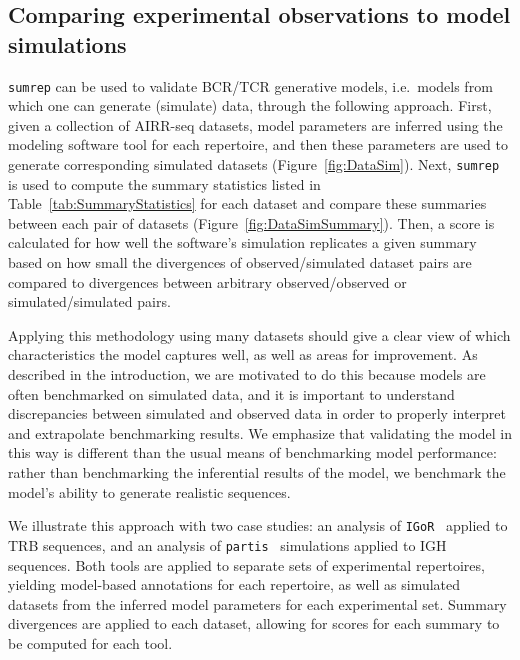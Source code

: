 \documentclass{article}
\newcommand{\partis}{\texttt{partis}}
\newcommand{\igor}{\texttt{IGoR}}
\begin{document}
\subsection*{Comparing experimental observations to model simulations}
\texttt{sumrep} can be used to validate BCR/TCR generative models, i.e.\ models from which one can generate (simulate) data, through the following approach.
First, given a collection of AIRR-seq datasets, model parameters are inferred using the modeling software tool for each repertoire, and then these parameters are used to generate corresponding simulated datasets (Figure~\ref{fig:DataSim}).
Next, \texttt{sumrep} is used to compute the summary statistics listed in Table~\ref{tab:SummaryStatistics} for each dataset and compare these summaries between each pair of datasets (Figure~\ref{fig:DataSimSummary}).
Then, a score is calculated for how well the software's simulation replicates a given summary based on how small the divergences of observed/simulated dataset pairs are compared to divergences between arbitrary observed/observed or simulated/simulated pairs.

Applying this methodology using many datasets should give a clear view of which characteristics the model captures well, as well as areas for improvement.
As described in the introduction, we are motivated to do this because models are often benchmarked on simulated data, and it is important to understand discrepancies between simulated and observed data in order to properly interpret and extrapolate benchmarking results.
We emphasize that validating the model in this way is different than the usual means of benchmarking model performance: rather than benchmarking the inferential results of the model, we benchmark the model's ability to generate realistic sequences.

We illustrate this approach with two case studies:
an analysis of \igor~\cite{Marcou2018-du} applied to TRB sequences, and an analysis of \partis~\cite{Ralph2016-nw, Ralph2016-iz} simulations applied to IGH sequences.
Both tools are applied to separate sets of experimental repertoires, yielding model-based annotations for each repertoire, as well as simulated datasets from the inferred model parameters for each experimental set.
Summary divergences are applied to each dataset, allowing for scores for each summary to be computed for each tool.
\end{document}
